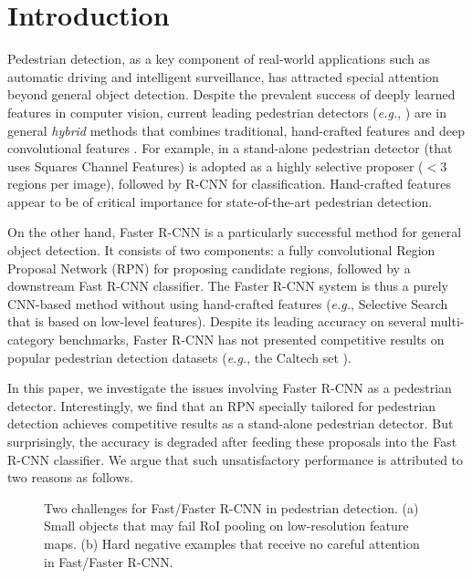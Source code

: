\documentclass[runningheads]{llncs}
\def\eg{\emph{e.g.}}
\begin{document}
\section{Introduction}

Pedestrian detection, as a key component of real-world applications such as automatic driving and intelligent surveillance, has attracted special attention beyond general object detection. Despite the prevalent success of deeply learned features in computer vision, current leading pedestrian detectors (\eg, \cite{hosang2015taking,tian2015pedestrian,tian2015deep,cai2015learning}) are in general \emph{hybrid} methods that combines traditional, hand-crafted features \cite{dollar2009integral,dollar2014fast} and deep convolutional features \cite{krizhevsky2012imagenet,simonyan2014very}. For example, in \cite{hosang2015taking} a stand-alone pedestrian detector \cite{benenson2014ten} (that uses Squares Channel Features) is adopted as a highly selective proposer ($<$3 regions per image), followed by R-CNN \cite{girshick2014rich} for classification. Hand-crafted features appear to be of critical importance for state-of-the-art pedestrian detection.

On the other hand, Faster R-CNN \cite{ren2015faster} is a particularly successful method for general object detection. It consists of two components: a fully convolutional Region Proposal Network (RPN) for proposing candidate regions, followed by a downstream Fast R-CNN \cite{girshickICCV15fastrcnn} classifier. The Faster R-CNN system is thus a purely CNN-based method without using hand-crafted features (\eg, Selective Search \cite{uijlings2013selective} that is based on low-level features). Despite its leading accuracy on several multi-category benchmarks, Faster R-CNN has not presented competitive results on popular pedestrian detection datasets (\eg, the Caltech set \cite{dollar2012pedestrian}).

In this paper, we investigate the issues involving Faster R-CNN as a pedestrian detector. Interestingly, we find that an RPN specially tailored for pedestrian detection achieves competitive results as a stand-alone pedestrian detector. But surprisingly, the accuracy is degraded after feeding these proposals into the Fast R-CNN classifier. We argue that such unsatisfactory performance is attributed to two reasons as follows.

\begin{figure}[t] \centering
{}
\caption{Two challenges for Fast/Faster R-CNN in pedestrian detection. (a) Small objects that may fail RoI pooling on low-resolution feature maps. (b) Hard negative examples that receive no careful attention in Fast/Faster R-CNN.}
\label{fig:hard-neg-example}
\end{figure}
\end{document}
